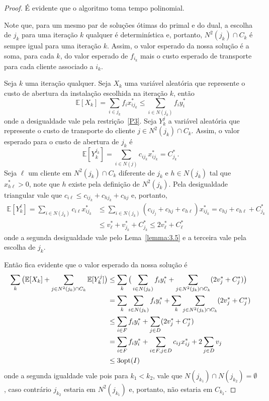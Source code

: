 \begin{proof}
É evidente que o algoritmo toma tempo polinomial.

Note que, para um mesmo par de soluções ótimas do primal e do dual, a escolha de $j_k$ para uma iteração $k$ qualquer é determinística e, portanto, $N^2(j_k) \cap C_k$ é sempre igual para uma iteração $k$. Assim, o valor esperado da nossa solução é a soma, para cada $k$, do valor esperado de $f_{i_k}$ mais o custo esperado de transporte para cada cliente associado a $i_k$. 

Seja $k$ uma iteração qualquer. Seja $X_k$ uma variável aleatória que represente o custo de abertura da instalação escolhida na iteração $k$, então
\[ \mathbb{E}[X_k] = \sum_{i \in j_k} f_i x^*_{ij_k} \leq \sum_{i \in N(j_k)} f_i y^*_i\]
onde a desigualdade vale pela restrição~\ref{P3}. Seja $Y_k^j$ a variável aleatória que represente o custo de transporte do cliente $j \in N^2(j_k) \cap C_k$. Assim, o valor esperado para o custo de abertura de $j_k$ é 
\[\mathbb{E}[Y_k^{j_k}] = \sum_{i \in N(j)} c_{ij_k} x^*_{ij_k} = C^*_{j_k}. \]
Seja $\ell$ um cliente em $N^2(j_k) \cap C_k$ diferente de $j_k$ e $h \in N(j_k)$ tal que $x^*_{h\ell} > 0$, note que $h$ existe pela definição de $N^2(j_k)$. Pela desigualdade triangular vale que $c_{i\ell} \leq c_{ij_k} + c_{hj_k} + c_{hj}$ e, portanto,
\begin{subequations} 
        \begin{align*}
        \mathbb{E}[Y_k^\ell] = \sum_{i \in N(j_k)} c_{i\ell}x^*_{ij_k} &\leq \sum_{i \in N(j_k)} (c_{ij_j} + c_{hj} + c_{h\ell})x^*_{ij_k} = c_{hj} + c_{h\ell} + C^*_{j_k}\\
        &\leq v^*_\ell + v^*_{j_k} + C^*_{j_k} \leq 2v^*_{\ell} + C^*_\ell 
        \end{align*}
\end{subequations}
onde a segunda desigualdade vale pelo Lema~\ref{lemma:3.5} e a terceira vale pela escolha de $j_k$.

Então fica evidente que o valor esperado da nossa solução é 
\begin{subequations}
        \begin{align*}
                \sum_k {\big (}\mathbb{E}[X_k] + \sum_{j \in N^2(j_k)\cap C_k}\mathbb{E}[Y_k^j] {\big )} &\leq \sum_k {\big (} \sum_{i \in N(j_k)}f_iy^*_i + \sum_{j \in N^2(j_k) \cap C_k} (2v^*_j + C^*_j) {\big )}  \\
                & = \sum_k \sum_{i \in N(j_k)}f_iy^*_i + \sum_k \sum_{j \in N^2(j_k)\cap C_k}(2v^*_j + C^*_j)\\
                &\leq\sum_{i \in F} f_iy^*_i + \sum_{j \in D }(2v^*_j + C^*_j)\\
                &= \sum_{i \in F} f_iy^*_i + \sum_{i \in F, j \in D} c_{ij}x^*_{ij} + 2\sum_{j \in D}v_j \\
                &\leq 3 \mathrm{opt}(I)
        \end{align*}
\end{subequations}
onde a segunda igualdade vale pois para $k_1 < k_2$, vale que $N(j_{k_1}) \cap N(j_{k_2}) = \emptyset$, caso contrário $j_{k_2}$ estaria em $N^2(j_{k_1})$ e, portanto, não estaria em $C_{k_2}$.
\end{proof}

